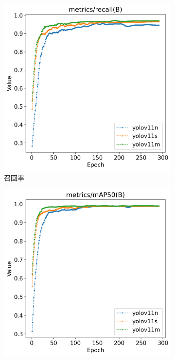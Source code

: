 \begin{figure}[H]
    \centering
    \begin{subfigure}[t]{0.43\textwidth}
        \centering
        \includegraphics[width=\textwidth]{figs/chap04/helmet_result/helmet_metrics_recall(B).png}
        \caption{召回率}
        \label{fig:helmet_metrics_recall}
    \end{subfigure}
    \begin{subfigure}[t]{0.43\textwidth}
        \centering
        \includegraphics[width=\textwidth]{figs/chap04/helmet_result/helmet_metrics_mAP50(B).png}

\end{subfigure}
\end{figure}
